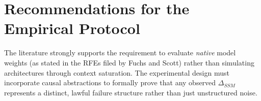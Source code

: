 \documentclass[12pt]{article}
\begin{document}
\section{Recommendations for the Empirical Protocol}
The literature strongly supports the requirement to evaluate \textit{native} model weights (as stated in the RFEs filed by Fuchs and Scott) rather than simulating architectures through context saturation. The experimental design must incorporate causal abstractions to formally prove that any observed $\Delta_{SSM}$ represents a distinct, lawful failure structure rather than just unstructured noise.
\end{document}

